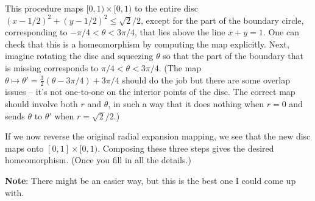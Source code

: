 \documentclass[letterpaper,12pt]{article}
\begin{document}
\begin{enumerate}
This procedure maps $[0,1)\times [0,1)$ to the entire disc $(x-1/2)^2+(y-1/2)^2\leq \sqrt{2}/2$, except for the part of the boundary circle, corresponding to $-\pi/4<\theta<3\pi/4$, that lies above the line $x+y=1$. One can check that this is a homeomorphism by computing the map explicitly. Next, imagine rotating the disc and squeezing $\theta$ so that the part of the boundary that is missing corresponds to $\pi/4<\theta<3\pi/4$. (The map $\theta \mapsto \theta' = \frac{3}{2}(\theta-3\pi/4)+3\pi/4$ should do the job but there are some overlap issues -- it's not one-to-one on the interior points of the disc. The correct map should involve both $r$ and $\theta$, in such a way that it does nothing when $r=0$ and sends $\theta$ to $\theta'$ when $r=\sqrt{2}/2$.)

If we now reverse the original radial expansion mapping, we see that the new disc maps onto $[0,1]\times [0,1)$. Composing these three steps gives the desired homeomorphism. (Once you fill in all the details.)

{\bf Note}: There might be an easier way, but this is the best one I could come up with.
\end{enumerate}
\end{document}
